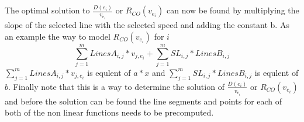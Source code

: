 The optimal solution to $\frac{D(e_i)}{v_{e_i}}$ or $R_{CO}(v_{e_i})$ can now be found by multiplying the slope of the selected line with the selected speed and adding the constant b. As an example the way to model $R_{CO}(v_{e_i})$ for $i$
\begin{equation*}
\sum_{j=1}^{m} LinesA_{i,j}*v_{j,e_i} + \sum_{j=1}^{m} SL_{i,j}*LinesB_{i,j} 
\end{equation*}
$\sum_{j=1}^{m} LinesA_{i,j}*v_{j,e_i}$ is equlent of $a*x$ and $\sum_{j=1}^{m} SL_{i,j}*LinesB_{i,j}$ is equlent of $b$. 
Finally note that this is a way to determine the solution of $\frac{D(e_i)}{v_{e_i}}$ or $R_{CO}(v_{e_i})$ and before the solution can be found the line segments and points for each of both of the non linear functions needs to be precomputed. 



